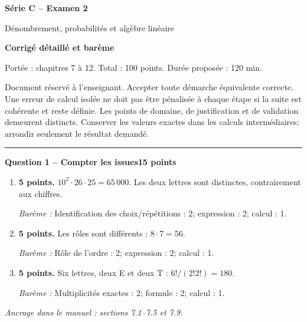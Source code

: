 \documentclass[11pt,a4paper]{article}
\begin{document}
{\LARGE\bfseries Série C -- Examen 2}\par
{\large Dénombrement, probabilités et algèbre linéaire}\par
\textbf{Corrigé détaillé et barème}\par
Portée : chapitres 7 à 12. Total : 100 points. Durée proposée : 120 min.\par
\small Document réservé à l’enseignant. Accepter toute démarche équivalente correcte. Une erreur de calcul isolée ne doit pas être pénalisée à chaque étape si la suite est cohérente et reste définie. Les points de domaine, de justification et de validation demeurent distincts. Conserver les valeurs exactes dans les calculs intermédiaires; arrondir seulement le résultat demandé.\normalsize\par
\vspace{3mm}\hrule\vspace{4mm}
{\large\bfseries Question 1 -- Compter les issues}\hfill\textbf{15 points}\par
\begin{enumerate}
\item \textbf{5 points.} \(10^2\cdot26\cdot25=65\,000\). Les deux lettres sont distinctes, contrairement aux chiffres.
\par{\small\textit{Barème : }Identification des choix/répétitions : 2; expression : 2; calcul : 1.}
\item \textbf{5 points.} Les rôles sont différents : \(8\cdot7=56\).
\par{\small\textit{Barème : }Rôle de l’ordre : 2; expression : 2; calcul : 1.}
\item \textbf{5 points.} Six lettres, deux E et deux T : \(6!/(2!2!)=180\).
\par{\small\textit{Barème : }Multiplicités exactes : 2; formule : 2; calcul : 1.}
\end{enumerate}
\vfill {\small\textit{Ancrage dans le manuel : sections 7.1--7.5 et 7.9.}}
\end{document}
